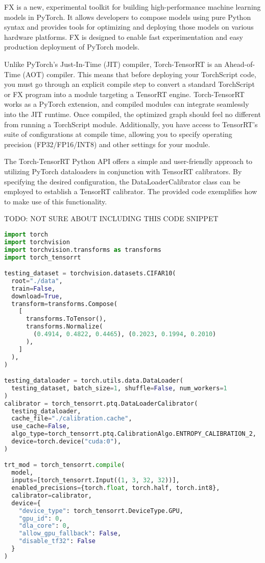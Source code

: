 FX is a new, experimental toolkit for building high-performance machine learning models in PyTorch. It allows developers to compose models using pure Python syntax and provides tools for optimizing and deploying those models on various hardware platforms. FX is designed to enable fast experimentation and easy production deployment of PyTorch models.

Unlike PyTorch's Just-In-Time (JIT) compiler, Torch-TensorRT is an Ahead-of-Time (AOT) compiler. This means that before deploying your TorchScript code, you must go through an explicit compile step to convert a standard TorchScript or FX program into a module targeting a TensorRT engine. Torch-TensorRT works as a PyTorch extension, and compiled modules can integrate seamlessly into the JIT runtime. Once compiled, the optimized graph should feel no different from running a TorchScript module. Additionally, you have access to TensorRT's suite of configurations at compile time, allowing you to specify operating precision (FP32/FP16/INT8) and other settings for your module.

The Torch-TensorRT Python API offers a simple and user-friendly approach to utilizing PyTorch dataloaders in conjunction with TensorRT calibrators. By specifying the desired configuration, the DataLoaderCalibrator class can be employed to establish a TensorRT calibrator. The provided code exemplifies how to make use of this functionality.

TODO: NOT SURE ABOUT INCLUDING THIS CODE SNIPPET
\begin{lstlisting}[language=Python]
import torch
import torchvision
import torchvision.transforms as transforms
import torch_tensorrt

testing_dataset = torchvision.datasets.CIFAR10(
  root="./data",
  train=False,
  download=True,
  transform=transforms.Compose(
    [
      transforms.ToTensor(),
      transforms.Normalize(
        (0.4914, 0.4822, 0.4465), (0.2023, 0.1994, 0.2010)
      ),
    ]
  ),
)

testing_dataloader = torch.utils.data.DataLoader(
  testing_dataset, batch_size=1, shuffle=False, num_workers=1
)
calibrator = torch_tensorrt.ptq.DataLoaderCalibrator(
  testing_dataloader,
  cache_file="./calibration.cache",
  use_cache=False,
  algo_type=torch_tensorrt.ptq.CalibrationAlgo.ENTROPY_CALIBRATION_2,
  device=torch.device("cuda:0"),
)

trt_mod = torch_tensorrt.compile(
  model,
  inputs=[torch_tensorrt.Input((1, 3, 32, 32))],
  enabled_precisions={torch.float, torch.half, torch.int8},
  calibrator=calibrator,
  device={
    "device_type": torch_tensorrt.DeviceType.GPU,
    "gpu_id": 0,
    "dla_core": 0,
    "allow_gpu_fallback": False,
    "disable_tf32": False
  }
)
\end{lstlisting}

